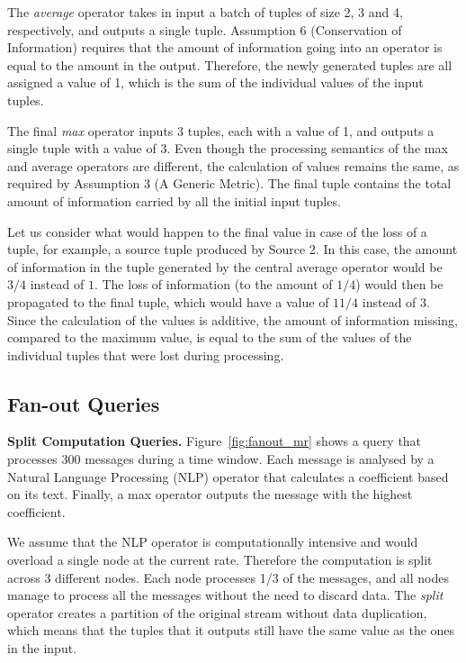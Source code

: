 The \textit{average} operator takes in input a batch of tuples of size 2, 3 and 4, respectively, and
outputs a single tuple. Assumption 6 (Conservation of Information) requires that the amount of
information going into an operator is equal to the amount in the output. Therefore, the newly generated
tuples are all assigned a \sic value of 1, which is the sum of the individual \sic values of the input
tuples.

The final \textit{max} operator inputs 3 tuples, each with a \sic value of 1, and outputs a single
tuple with a \sic value of 3. Even though the processing semantics of the max and average operators are
different, the calculation of \sic values remains the same, as required by Assumption 3 (A Generic
Metric).
The final tuple contains the total amount of information carried by all the initial input tuples. 

Let us consider what would happen to the final \sic value in case of the loss of a tuple, for example, a
source tuple produced by Source 2. In this case, the amount of information in the tuple generated by the
central average operator would be $3/4$ instead of $1$. The loss of information (\ie to the amount
of $1/4$) would then be propagated to the final tuple, which would have a \sic value of $11/4$ instead of
$3$.
Since the calculation of the \sic values is additive, the amount of information missing, compared to
the maximum value, is equal to the sum of the \sic values of the individual tuples that
were lost during processing.

\subsection*{Fan-out Queries}

\textbf{Split Computation Queries.} Figure~\ref{fig:fanout_mr} shows a query that processes 300 messages
during a time window. Each message is analysed by a Natural Language Processing (NLP) operator that calculates a
coefficient based on its text. Finally, a max operator outputs the message with the highest coefficient. 

We assume that the NLP operator is computationally intensive and would overload a single node at the
current rate. Therefore the computation is split across 3 different nodes. Each node processes 1/3 of
the messages, and all nodes manage to process all the messages without the need to discard data.
The \textit{split} operator creates a partition of the original stream without data
duplication, which means that the tuples that it outputs still have the same \sic value as the ones in
the input.

